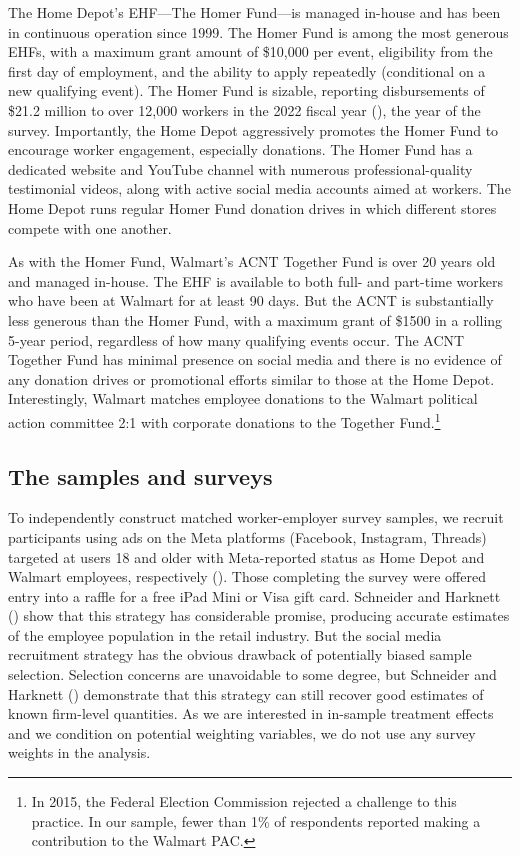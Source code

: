 \documentclass[
  11pt,
  oneside]{article}
\begin{document}
The Home Depot's EHF---The Homer Fund---is managed in-house and has been in continuous operation since 1999. The Homer Fund is among the most generous EHFs, with a maximum grant amount of \$10,000 per event, eligibility from the first day of employment, and the ability to apply repeatedly (conditional on a new qualifying event). The Homer Fund is sizable, reporting disbursements of \$21.2 million to over 12,000 workers in the 2022 fiscal year (), the year of the survey. Importantly, the Home Depot aggressively promotes the Homer Fund to encourage worker engagement, especially donations. The Homer Fund has a dedicated website and YouTube channel with numerous professional-quality testimonial videos, along with active social media accounts aimed at workers. The Home Depot runs regular Homer Fund donation drives in which different stores compete with one another.

As with the Homer Fund, Walmart's ACNT Together Fund is over 20 years old and managed in-house. The EHF is available to both full- and part-time workers who have been at Walmart for at least 90 days. But the ACNT is substantially less generous than the Homer Fund, with a maximum grant of \$1500 in a rolling 5-year period, regardless of how many qualifying events occur. The ACNT Together Fund has minimal presence on social media and there is no evidence of any donation drives or promotional efforts similar to those at the Home Depot. Interestingly, Walmart matches employee donations to the Walmart political action committee 2:1 with corporate donations to the Together Fund.\footnote{In 2015, the Federal Election Commission rejected a challenge to this practice. In our sample, fewer than 1\% of respondents reported making a contribution to the Walmart PAC.}

\subsection{The samples and surveys}\label{the-samples-and-surveys}

To independently construct matched worker-employer survey samples, we recruit participants using ads on the Meta platforms (Facebook, Instagram, Threads) targeted at users 18 and older with Meta-reported status as Home Depot and Walmart employees, respectively (). Those completing the survey were offered entry into a raffle for a free iPad Mini or Visa gift card. Schneider and Harknett () show that this strategy has considerable promise, producing accurate estimates of the employee population in the retail industry. But the social media recruitment strategy has the obvious drawback of potentially biased sample selection. Selection concerns are unavoidable to some degree, but Schneider and Harknett () demonstrate that this strategy can still recover good estimates of known firm-level quantities. As we are interested in in-sample treatment effects and we condition on potential weighting variables, we do not use any survey weights in the analysis.
\end{document}
